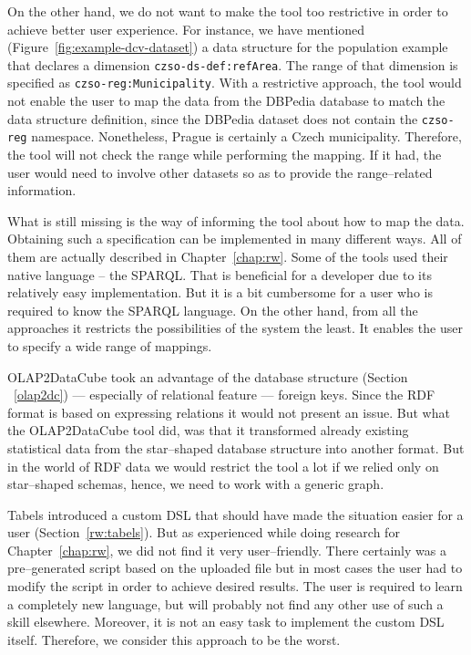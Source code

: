 \begin{sloppypar}
On the other hand, we do not want to make the tool too restrictive in order to 
achieve better user experience. For instance, we have mentioned
(Figure~\ref{fig:example-dcv-dataset}) a data structure 
for the population example that declares a dimension \texttt{czso-ds-def:refArea}. 
The range of that dimension is specified as \texttt{czso-reg:Municipality}. 
With a restrictive approach, the tool would not enable the user to map the data from 
the DBPedia database to match the data structure definition, since the DBPedia 
dataset does not contain the \texttt{czso-reg} namespace. Nonetheless, Prague is 
certainly a Czech municipality. Therefore, the tool will not check the range 
while performing the mapping. If it had, the user would need to involve 
other datasets so as to provide the range--related information.
\end{sloppypar}

What is still missing is the way of informing the tool about how to map the data.
Obtaining such a specification can be implemented in many different ways. 
All of them are actually described in Chapter~\ref{chap:rw}. Some of the tools used 
their native language -- the SPARQL. That is beneficial for a developer due to 
its relatively easy implementation. But it is a bit cumbersome for a user 
who is required to know the SPARQL language. On the other hand, from all the approaches
it restricts the possibilities of the system the least. It enables the user 
to specify a wide range of mappings.

OLAP2DataCube took an advantage of the database structure (Section ~\ref{olap2dc}) --- 
especially of relational feature --- foreign keys. Since the RDF format 
is based on expressing relations it would not present an issue. But what the 
OLAP2DataCube tool did, was that it transformed already existing statistical data from
the star--shaped database structure into another format. But in the world of RDF 
data we would restrict the tool a lot if we relied only on star--shaped 
schemas, hence, we need to work with a generic graph.

Tabels introduced a custom DSL that should have made the situation easier for 
a user (Section~\ref{rw:tabels}). But as experienced while doing research for Chapter~\ref{chap:rw}, 
we did not find it very user--friendly. There certainly was a pre--generated script based
on the uploaded file but in most cases the user had to modify the script in order to
achieve desired results. The user is required to learn a 
completely new language, but will probably not find any other use of such a skill
elsewhere. Moreover, it is not an easy task to implement the 
custom DSL itself. Therefore, we consider this approach to be the worst.

